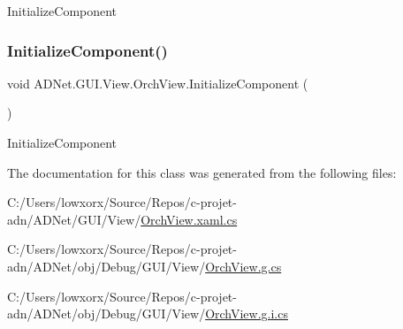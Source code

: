 Initialize\+Component 

\mbox{\label{class_a_d_net_1_1_g_u_i_1_1_view_1_1_orch_view_af719b7ad90d168d17d8bb05669356549}} 
\subsubsection{\texorpdfstring{Initialize\+Component()}{InitializeComponent()}\hspace{0.1cm}{\footnotesize\ttfamily [2/2]}}
{\footnotesize\ttfamily void A\+D\+Net.\+G\+U\+I.\+View.\+Orch\+View.\+Initialize\+Component (\begin{DoxyParamCaption}{ }\end{DoxyParamCaption})}



Initialize\+Component 



The documentation for this class was generated from the following files\+:\begin{DoxyCompactItemize}
\item 
C\+:/\+Users/lowxorx/\+Source/\+Repos/c-\/projet-\/adn/\+A\+D\+Net/\+G\+U\+I/\+View/\hyperlink{_orch_view_8xaml_8cs}{Orch\+View.\+xaml.\+cs}\item 
C\+:/\+Users/lowxorx/\+Source/\+Repos/c-\/projet-\/adn/\+A\+D\+Net/obj/\+Debug/\+G\+U\+I/\+View/\hyperlink{_orch_view_8g_8cs}{Orch\+View.\+g.\+cs}\item 
C\+:/\+Users/lowxorx/\+Source/\+Repos/c-\/projet-\/adn/\+A\+D\+Net/obj/\+Debug/\+G\+U\+I/\+View/\hyperlink{_orch_view_8g_8i_8cs}{Orch\+View.\+g.\+i.\+cs}\end{DoxyCompactItemize}
